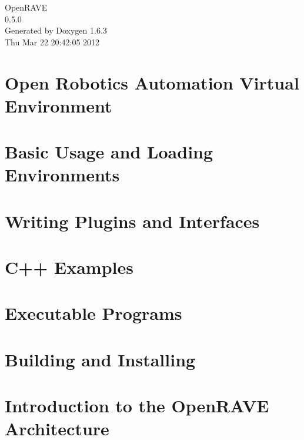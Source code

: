 \documentclass[letterpaper]{article}
\begin{document}
\hypersetup{pageanchor=false}
\begin{titlepage}
\vspace*{7cm}
\begin{center}
{\Large OpenRAVE \\[1ex]\large 0.5.0 }\\
\vspace*{1cm}
{\large Generated by Doxygen 1.6.3}\\
\vspace*{0.5cm}
{\small Thu Mar 22 20:42:05 2012}\\
\end{center}
\end{titlepage}
\tableofcontents
{}
\hypersetup{pageanchor=true}
\clearemptydoublepage
\section{Open Robotics Automation Virtual Environment}
\label{index}\hypertarget{index}{}
\clearemptydoublepage
\section{Basic Usage and Loading Environments}
\label{p_basic_usage}
\hypertarget{p_basic_usage}{}

\clearemptydoublepage
\section{Writing Plugins and Interfaces}
\label{writing_plugins}
\hypertarget{writing_plugins}{}

\clearemptydoublepage
\section{C++ Examples}
\label{cpp_examples}
\hypertarget{cpp_examples}{}

\clearemptydoublepage
\section{Executable Programs}
\label{executables}
\hypertarget{executables}{}

\clearemptydoublepage
\section{Building and Installing}
\label{installation}
\hypertarget{installation}{}

\clearemptydoublepage
\section{Introduction to the OpenRAVE Architecture}
\label{architecture_concepts}
\hypertarget{architecture_concepts}{}

\clearemptydoublepage
\end{document}
